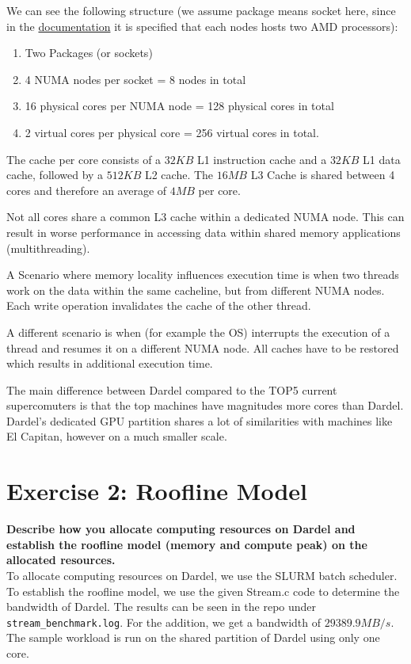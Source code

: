 \documentclass[a4paper,10pt]{article}
\begin{document}
We can see the following structure (we assume package means socket here, since in the \href{https://www.pdc.kth.se/hpc-services/computing-systems/dardel-hpc-system/about-the-dardel-system-1.1053338#:~:text=Each%20node%20has%20two%20AMD%20EPYC™%C2%A0Zen2%202.25%20GHz%2064%2Dcore%20processors%2C%20which%20means%20that%20each%20compute%20node%20has%20a%20total%20of%20128%20physical%20CPU%20cores}{documentation} it is specified that each nodes hosts two AMD processors):
\begin{enumerate}
  \item Two Packages (or sockets)
  \item 4 NUMA nodes per socket = 8 nodes in total
  \item 16 physical cores per NUMA node = 128 physical cores in total
  \item 2 virtual cores per physical core = 256 virtual cores in total.
\end{enumerate}
The cache per core consists of a $32 KB$ L1 instruction cache and a $32 KB$ L1 data cache, followed by a $512 KB$ L2 cache. The $16 MB$ L3 Cache is shared between 4 cores and therefore an average of $4MB$ per core.

Not all cores share a common L3 cache within a dedicated NUMA node.
This can result in worse performance in accessing data within shared memory applications (multithreading).

A Scenario where memory locality influences execution time is when two threads work on the data within the same cacheline, but from different NUMA nodes.
Each write operation invalidates the cache of the other thread.

A different scenario is when (for example the OS) interrupts the execution of a thread and resumes it on a different NUMA node.
All caches have to be restored which results in additional execution time.

The main difference between Dardel compared to the TOP5 current supercomuters is that the top machines have magnitudes more cores than Dardel.
Dardel's dedicated GPU partition shares a lot of similarities with machines like El Capitan, however on a much smaller scale.

\section{Exercise 2: Roofline Model}
\textbf{Describe how you allocate computing resources on Dardel and establish the roofline model (memory and compute peak) on the allocated resources.}\\
To allocate computing resources on Dardel, we use the SLURM batch scheduler. To establish the roofline
model, we use the given Stream.c code to determine the bandwidth of Dardel.  
The results can be seen in the repo under \verb|stream_benchmark.log|.
For the addition, we get a bandwidth of $29389.9 MB/s$.
The sample workload is run on the shared partition of Dardel using only one core. 
\end{document}
